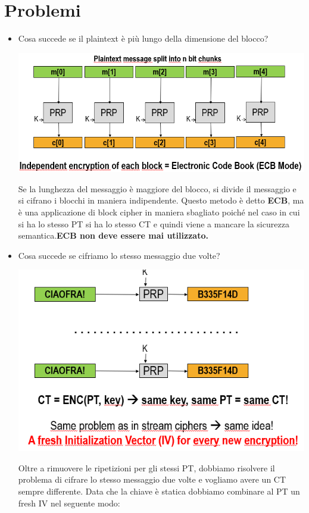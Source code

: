 \documentclass{book}
\theoremstyle{remark}
\begin{document}
\section{Problemi}
\begin{itemize}
	\item Cosa succede se il plaintext è più lungo della dimensione del blocco?
	      \begin{center}
		      \includegraphics[scale=0.5]{probl1.png}
	      \end{center}
	      Se la lunghezza del messaggio è maggiore del blocco, si divide il messaggio e si cifrano i blocchi in maniera indipendente\@. Questo metodo è detto \textbf{ECB}, ma è una applicazione di block cipher in maniera sbagliato poiché nel caso in cui si ha lo stesso PT si ha lo stesso CT e quindi viene a mancare la sicurezza semantica\@.\newline \textbf{ECB non deve essere mai utilizzato\@.}
	\item Cosa succede se cifriamo lo stesso messaggio due volte?
	      \begin{center}
		      \includegraphics[scale=0.5]{probl2.png}
	      \end{center}
	      Oltre a rimuovere le ripetizioni per gli stessi PT, dobbiamo risolvere il problema di cifrare lo stesso messaggio due volte e vogliamo avere un CT sempre differente\@. Data che la chiave è statica dobbiamo combinare al PT un fresh IV nel seguente modo:

\end{itemize}
\end{document}
